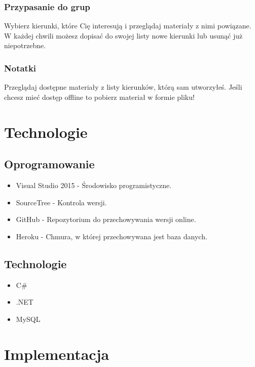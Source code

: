 \documentclass[12pt,a4paper]{article}
\begin{document}
			\subsubsection{Przypasanie do grup}
				Wybierz kierunki, które Cię interesują i przeglądaj materiały z nimi powiązane. W każdej chwili możesz dopisać do swojej listy nowe kierunki lub usunąć już niepotrzebne.
			\subsubsection{Notatki}
				Przeglądaj dostępne materiały z listy kierunków, którą sam utworzyłeś. Jeśli chcesz mieć dostęp offline to pobierz materiał w formie pliku!
	\section{Technologie}
			\subsection{Oprogramowanie}
			\begin{itemize}
			\item Visual Studio 2015 - Środowisko programistyczne.
			\item SourceTree - Kontrola wersji.
			\item GitHub - Repozytorium do przechowywania wersji online.
			\item Heroku - Chmura, w której przechowywana jest baza danych.
			\end{itemize}
			\subsection{Technologie}
			\begin{itemize}
			\item C\#
			\item .NET
			\item MySQL
			\end{itemize}
			\clearpage
	\section{Implementacja}
\end{document}
